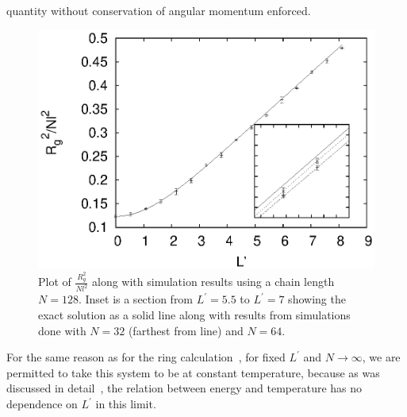 \documentclass[pre,showpacs]{revtex4}
\begin{document}
quantity without conservation of angular momentum enforced.
\begin{figure}
\begin{center}
\includegraphics[width=\hsize]{radius}
\caption{Plot of $\frac{R_g^2}{Nl^2}$ along with simulation results
using a chain length $N = 128$. Inset is a section from $L^\prime=5.5$
to $L^\prime=7$ showing the exact solution as a solid line along with results from simulations done with $N = 32$ (farthest from line)
and $N = 64$. }
\label{fig:rgplot}
\end{center}
\end{figure}

For the same reason as for the ring calculation~\cite{DeutschExactVac}, for fixed $L^\prime$ and $N\to \infty$, we are permitted to take this
system to be at constant temperature, because as was discussed in detail~\cite{DeutschExactVac}, the relation between energy and temperature
has no dependence on $L^\prime$ in this limit.
\end{document}
